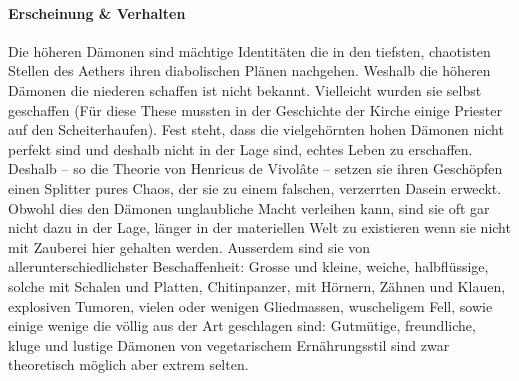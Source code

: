 \documentclass[10pt,twoside,twocolumn,openany]{book}
\begin{document}
\begin{multicols}{2}
	
	\paragraph{Erscheinung \& Verhalten}
	Die höheren Dämonen sind mächtige Identitäten die in den tiefsten, chaotisten Stellen des Aethers ihren diabolischen Plänen nachgehen.
	Weshalb die höheren Dämonen die niederen schaffen ist nicht bekannt. Vielleicht wurden sie selbst geschaffen (Für diese These mussten in der Geschichte der Kirche einige Priester auf den Scheiterhaufen). Fest steht, dass die vielgehörnten hohen Dämonen nicht perfekt sind und deshalb nicht in der Lage sind, echtes Leben zu erschaffen. Deshalb – so die Theorie von Henricus de Vivolâte – setzen sie ihren Geschöpfen einen Splitter pures Chaos, der sie zu einem falschen, verzerrten Dasein erweckt. Obwohl dies den Dämonen unglaubliche Macht verleihen kann, sind sie oft gar nicht dazu in der Lage, länger in der materiellen Welt zu existieren wenn sie nicht mit Zauberei hier gehalten werden. Ausserdem sind sie von allerunterschiedlichster Beschaffenheit: Grosse und kleine, weiche, halbflüssige, solche mit Schalen und Platten, Chitinpanzer, mit Hörnern, Zähnen und Klauen, explosiven Tumoren, vielen oder wenigen Gliedmassen, wuscheligem Fell, sowie einige wenige die völlig aus der Art geschlagen sind: Gutmütige, freundliche, kluge und lustige Dämonen von vegetarischem Ernährungsstil sind zwar theoretisch möglich aber extrem selten.
\end{multicols}
\end{document}
